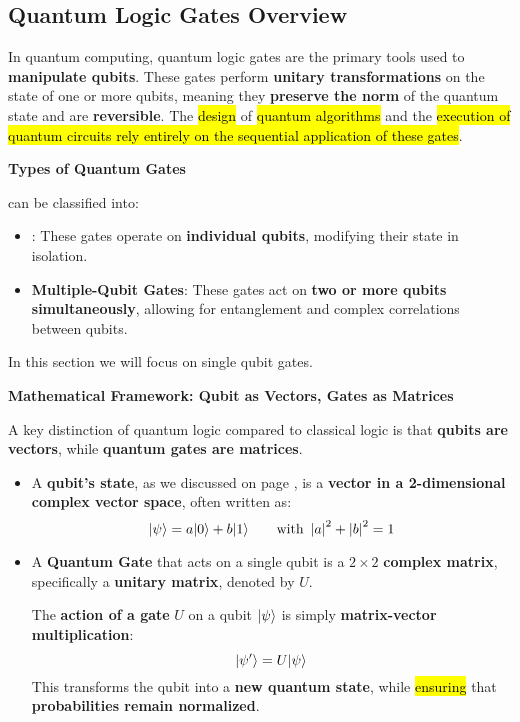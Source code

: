 \subsection{Quantum Logic Gates Overview}

In quantum computing, quantum logic gates are the primary tools used to \textbf{manipulate qubits}. These gates perform \textbf{unitary transformations} on the state of one or more qubits, meaning they \textbf{preserve the norm} of the quantum state and are \textbf{reversible}. The \hl{design} of \hl{quantum algorithms} and the \hl{execution of quantum circuits rely entirely on the sequential application of these gates}.

\highspace
\begin{flushleft}
    \textcolor{Green3}{ \textbf{Types of Quantum Gates}}
\end{flushleft}
 can be classified into:
\begin{itemize}
    \item {}: These gates operate on \textbf{individual qubits}, modifying their state in isolation.
    \item \textbf{Multiple-Qubit Gates}: These gates act on \textbf{two or more qubits simultaneously}, allowing for entanglement and complex correlations between qubits.
\end{itemize}
In this section we will focus on single qubit gates.

\highspace
\begin{flushleft}
    \textcolor{Green3}{ \textbf{Mathematical Framework: Qubit as Vectors, Gates as Matrices}}
\end{flushleft}
A key distinction of quantum logic compared to classical logic is that \textbf{qubits are vectors}, while \textbf{quantum gates are matrices}.
\begin{itemize}
    \item A \textbf{qubit's state}, as we discussed on page \pageref{subsection: Single Qubits}, is a \textbf{vector in a 2-dimensional complex vector space}, often written as:
    \begin{equation*}
        | \psi \rangle = a| 0 \rangle + b| 1 \rangle \hspace{2em} \text{with } \left|a\right|^{2} + \left|b\right|^{2} = 1
    \end{equation*}

    \item A \textbf{Quantum Gate} that acts on a single qubit is a $2 \times 2$ \textbf{complex matrix}, specifically a \textbf{unitary matrix}, denoted by $U$.

    The \textbf{action of a gate} $U$ on a qubit $| \psi \rangle$ is simply \textbf{matrix-vector multiplication}:
    \begin{equation}
        | \psi' \rangle = U| \psi \rangle
    \end{equation}
    This transforms the qubit into a \textbf{new quantum state}, while \hl{ensuring} that \textbf{probabilities remain normalized}.
\end{itemize}

